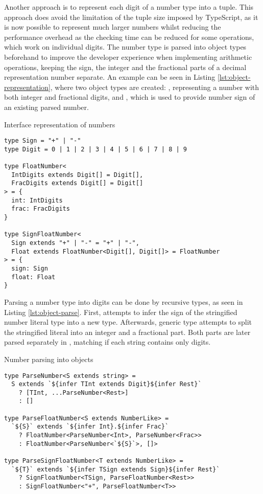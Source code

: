 Another approach is to represent each digit of a number type into a tuple. This approach does avoid the limitation of the tuple size imposed by TypeScript, as it is now possible to represent much larger numbers whilst reducing the performance overhead as the checking time can be reduced for some operations, which work on individual digits. The number type is parsed into object types beforehand to improve the developer experience when implementing arithmetic operations, keeping the sign, the integer and the fractional parts of a decimal representation number separate. An example can be seen in Listing \ref{lst:object-representation}, where two object types are created: , representing a number with both integer and fractional digits, and , which is used to provide number sign of an existing parsed number.

\begin{listing}[ht]
  \caption{Interface representation of numbers}\label{lst:object-representation}
  \begin{verbatim}
type Sign = "+" | "-"
type Digit = 0 | 1 | 2 | 3 | 4 | 5 | 6 | 7 | 8 | 9

type FloatNumber<
  IntDigits extends Digit[] = Digit[],
  FracDigits extends Digit[] = Digit[]
> = {
  int: IntDigits
  frac: FracDigits
}

type SignFloatNumber<
  Sign extends "+" | "-" = "+" | "-",
  Float extends FloatNumber<Digit[], Digit[]> = FloatNumber
> = {
  sign: Sign
  float: Float
}
\end{verbatim}
\end{listing}

Parsing a number type into digits can be done by recursive types, as seen in Listing \ref{lst:object-parse}. First,  attempts to infer the sign of the stringified number literal type into a new  type. Afterwards,  generic type attempts to split the stringified literal into an integer and a fractional part. Both parts are later parsed separately in , matching if each string contains only digits.

\begin{listing}[ht]
  \caption{Number parsing into objects}\label{lst:object-parse}
  \begin{verbatim}
type ParseNumber<S extends string> =
  S extends `${infer TInt extends Digit}${infer Rest}`
    ? [TInt, ...ParseNumber<Rest>]
    : []

type ParseFloatNumber<S extends NumberLike> =
  `${S}` extends `${infer Int}.${infer Frac}`
    ? FloatNumber<ParseNumber<Int>, ParseNumber<Frac>>
    : FloatNumber<ParseNumber<`${S}`>, []>

type ParseSignFloatNumber<T extends NumberLike> =
  `${T}` extends `${infer TSign extends Sign}${infer Rest}`
    ? SignFloatNumber<TSign, ParseFloatNumber<Rest>>
    : SignFloatNumber<"+", ParseFloatNumber<T>>
\end{verbatim}
\end{listing}

